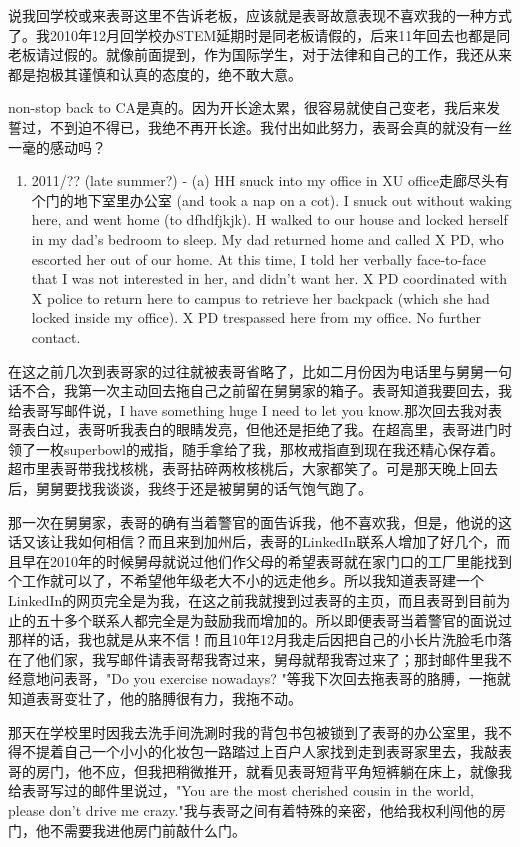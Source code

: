 \documentclass[12pt]{book}
\begin{document}
说我回学校或来表哥这里不告诉老板，应该就是表哥故意表现不喜欢我的一种方式了。我2010年12月回学校办STEM延期时是同老板请假的，后来11年回去也都是同老板请过假的。就像前面提到，作为国际学生，对于法律和自己的工作，我还从来都是抱极其谨慎和认真的态度的，绝不敢大意。

non-stop back to CA是真的。因为开长途太累，很容易就使自己变老，我后来发誓过，不到迫不得已，我绝不再开长途。我付出如此努力，表哥会真的就没有一丝一毫的感动吗？

\begin{enumerate}
\item 2011/?? (late summer?) - (a) HH snuck into my office in XU office走廊尽头有个门的地下室里办公室 (and took a nap on a cot). I snuck out without waking here, and went home (to dfhdfjkjk). H walked to our house and locked herself in my dad's bedroom to sleep. My dad returned home and called X PD, who escorted her out of our home. At this time, I told her verbally face-to-face that I was not interested in her, and didn't want her. X PD coordinated with X police to return here to campus to retrieve her backpack (which she had locked inside my office). X PD trespassed here from my office. No further contact.
\end{enumerate}

在这之前几次到表哥家的过往就被表哥省略了，比如二月份因为电话里与舅舅一句话不合，我第一次主动回去拖自己之前留在舅舅家的箱子。表哥知道我要回去，我给表哥写邮件说，I have something huge I need to let you know.那次回去我对表哥表白过，表哥听我表白的眼睛发亮，但他还是拒绝了我。在超高里，表哥进门时领了一枚superbowl的戒指，随手拿给了我，那枚戒指直到现在我还精心保存着。超市里表哥带我找核桃，表哥拈碎两枚核桃后，大家都笑了。可是那天晚上回去后，舅舅要找我谈谈，我终于还是被舅舅的话气饱气跑了。

那一次在舅舅家，表哥的确有当着警官的面告诉我，他不喜欢我，但是，他说的这话又该让我如何相信？而且来到加州后，表哥的LinkedIn联系人增加了好几个，而且早在2010年的时候舅母就说过他们作父母的希望表哥就在家门口的工厂里能找到个工作就可以了，不希望他年级老大不小的远走他乡。所以我知道表哥建一个LinkedIn的网页完全是为我，在这之前我就搜到过表哥的主页，而且表哥到目前为止的五十多个联系人都完全是为鼓励我而增加的。所以即便表哥当着警官的面说过那样的话，我也就是从来不信！而且10年12月我走后因把自己的小长片洗脸毛巾落在了他们家，我写邮件请表哥帮我寄过来，舅母就帮我寄过来了；那封邮件里我不经意地问表哥，"Do you exercise nowadays? "等我下次回去拖表哥的胳膊，一拖就知道表哥变壮了，他的胳膊很有力，我拖不动。

那天在学校里时因我去洗手间洗涮时我的背包书包被锁到了表哥的办公室里，我不得不提着自己一个小小的化妆包一路踏过上百户人家找到走到表哥家里去，我敲表哥的房门，他不应，但我把稍微推开，就看见表哥短背平角短裤躺在床上，就像我给表哥写过的邮件里说过，"You are the most cherished cousin in the world, please don't drive me crazy."我与表哥之间有着特殊的亲密，他给我权利闯他的房门，他不需要我进他房门前敲什么门。
\end{document}
